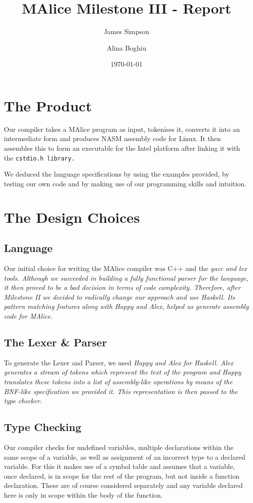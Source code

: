 \documentclass[11pt]{article}
\title{MAlice Milestone III - Report}
\author{James Simpson \and Alina Boghiu}
\date{\today}
\begin{document}
\maketitle

\section{The Product}
Our compiler takes a MAlice program as input, tokenises it, converts it into an intermediate form and produces NASM assembly code for Linux. It then assembles this to form an executable for the Intel platform after linking it with the \tt cstdio.h \rm library.

We deduced the language specifications by using the examples provided, by testing our own code and by making use of our programming skills and intuition.

\section{The Design Choices}

\subsection{Language}
Our initial choice for writing the MAlice compiler was C++ and the \sl yacc \rm and \sl lex \rm tools. Although we succeeded in building a fully functional parser for the language, it then proved to be a bad decision in terms of code complexity. Therefore, after Milestone II we decided to radically change our approach and use Haskell. Its pattern matching features along with Happy and Alex, helped us generate assembly code for MAlice.

\subsection{The Lexer \& Parser}
To generate the Lexer and Parser, we used \sl Happy \rm and \sl Alex \rm for Haskell. Alex generates a stream of tokens which represent the text of the program and Happy translates these tokens into a list of assembly-like operations by means of the BNF-like specification we provided it. This representation is then passed to the type checker.

\subsection{Type Checking}
Our compiler checks for undefined variables, multiple declarations within the same scope of a variable, as well as assignment of an incorrect type to a declared variable. For this it makes use of a symbol table and assumes that a variable, once declared, is in scope for the rest of the program, but not inside a function declaration. These are of course considered separately and any variable declared here is only in scope within the body of the function.
\end{document}
